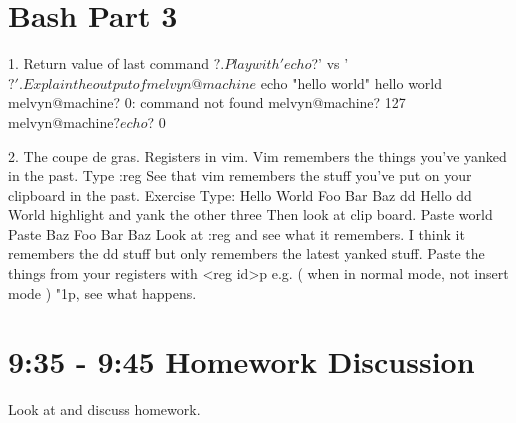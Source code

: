 \documentclass[10pt]{article}
\begin{document}
\section*{ Bash Part 3 }

1. Return value of last command $?. Play with 'echo $?' vs '$?'.
Explain the output of

melvyn@machine$ echo "hello world"
hello world 
melvyn@machine$ $?
0: command not found
melvyn@machine$ $?
127
melvyn@machine$? echo $?
0


2. The coupe de gras. Registers in vim. Vim remembers the things you've yanked in the past. Type :reg
See that vim remembers the stuff you've put on your clipboard in the past.
Exercise
Type:
Hello
World
Foo
Bar
Baz
dd Hello
dd World
highlight and yank the other three
Then look at clip board.
Paste world
Paste Baz
Foo
Bar
Baz
Look at :reg and see what it remembers. I think it remembers the dd stuff but only remembers the latest yanked stuff.
Paste the things from your registers with <reg id>p e.g. ( when  in normal mode, not insert mode ) "1p, see what happens. 


\section*{ 9:35 - 9:45 Homework Discussion }
Look at and discuss homework.
\end{document}
